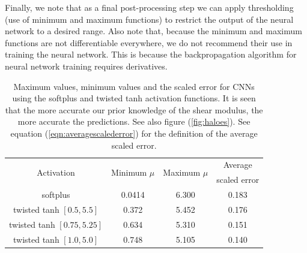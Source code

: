 \documentclass[10pt]{article}
\begin{document}
Finally, we note that as a final post-processing step we can apply thresholding (use of minimum and maximum functions) to restrict the output of the neural network to a desired range. Also note that, because the minimum and maximum functions are not differentiable everywhere, we do not recommend their use in training the neural network. This is because the backpropagation algorithm for neural network training requires derivatives.
\begin{table}
  \centering
  \begin{tabular}{|c|c|c|c|}
    \hline
    \multirow{2}{*}{Activation}  & \multirow{2}{*}{Minimum $\mu$} & \multirow{2}{*}{Maximum $\mu$} & {Average}\\
                                 &                                &                                & scaled error\\
    \hline
    softplus                 & 0.0414       & 6.300            & 0.183\\
    \hline
    twisted tanh $[0.5, 5.5]$  & 0.372        & 5.452          & 0.176\\     
    \hline
    twisted tanh $[0.75,5.25]$ & 0.634        & 5.310          & 0.151\\
    \hline
    twisted tanh $[1.0, 5.0]$  & 0.748        & 5.105          & 0.140\\
    \hline
  \end{tabular}
  \caption{\label{table:muminmax} Maximum values, minimum values and the scaled error for CNNs using the softplus and twisted tanh activation functions. It is seen that the more accurate our prior knowledge of the shear modulus, the more accurate the predictions. See also figure (\ref{fig:haloes}). See equation (\ref{eqn:averagescalederror}) for the definition of the average scaled error.}
\end{table}
\end{document}
